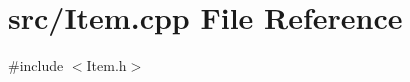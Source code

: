 \section{src/\+Item.cpp File Reference}
\label{_item_8cpp}
{\ttfamily \#include $<$Item.\+h$>$}\newline
